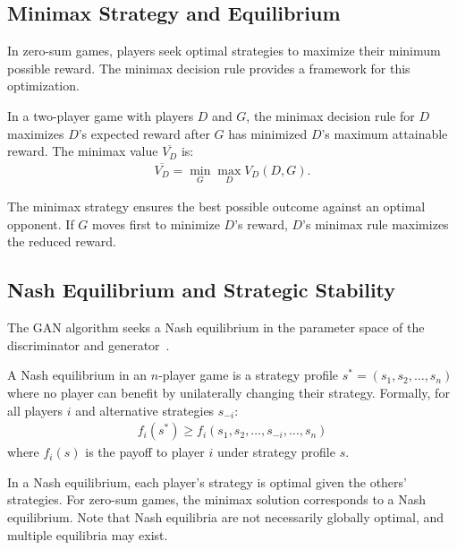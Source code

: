 \subsection{Minimax Strategy and Equilibrium}
In zero-sum games, players seek optimal strategies to maximize their minimum possible reward. The minimax decision rule provides a framework for this optimization.
\begin{definition}
	\label{def:minimax}
	In a two-player game with players $D$ and $G$, the \textnormal{\sffamily minimax decision rule} for $D$ maximizes $D$'s expected reward after $G$ has minimized $D$'s maximum attainable reward. The \textnormal{\sffamily minimax value} $\overline{V_D}$ is:
	\begin{align}
		\overline{V_D} = \min_{G} \max_{D} V_D(D, G).
	\end{align}
\end{definition}
The minimax strategy ensures the best possible outcome against an optimal opponent. If $G$ moves first to minimize $D$'s reward, $D$'s minimax rule maximizes the reduced reward.
\subsection{Nash Equilibrium and Strategic Stability}
The GAN algorithm seeks a Nash equilibrium in the parameter space of the discriminator and generator~\cite{ref:goodfellow-2016,ref:goodfellow-2017}.
\begin{definition}
	A \textnormal{\sffamily Nash equilibrium} in an $n$-player game is a strategy profile $s^* = (s_1, s_2, \dots, s_n)$ where no player can benefit by unilaterally changing their strategy. Formally, for all players $i$ and alternative strategies $s_{-i}$:
	\begin{align}
		f_i(s^*) \geq f_i(s_1, s_2, \dots, s_{-i}, \dots, s_n)
	\end{align}
	where $f_i(s)$ is the payoff to player $i$ under strategy profile $s$.
\end{definition}
\begin{remark}
	In a Nash equilibrium, each player's strategy is optimal given the others' strategies. For zero-sum games, the minimax solution corresponds to a Nash equilibrium. Note that Nash equilibria are not necessarily globally optimal, and multiple equilibria may exist.
\end{remark}
